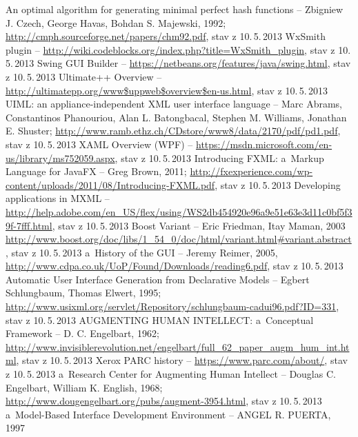 \documentclass[11pt,twoside,a4paper]{book}
\begin{document}

\begin{thebibliography}{99}
 An optimal algorithm for generating minimal perfect hash functions -- Zbigniew J. Czech, George Havas, Bohdan S. Majewski, 1992; \url{http://cmph.sourceforge.net/papers/chm92.pdf}, stav z 10.\,5.\,2013
 WxSmith plugin -- \url{http://wiki.codeblocks.org/index.php?title=WxSmith_plugin}, stav z 10.\,5.\,2013
 Swing GUI Builder -- \url{https://netbeans.org/features/java/swing.html}, stav z 10.\,5.\,2013
 Ultimate++ Overview -- \url{http://ultimatepp.org/www$uppweb$overview$en-us.html}, stav z 10.\,5.\,2013
 UIML: an appliance-independent XML user interface language -- Marc Abrams, Constantinos Phanouriou, Alan L. Batongbacal, Stephen M. Williams, Jonathan E. Shuster; \url{http://www.ramb.ethz.ch/CDstore/www8/data/2170/pdf/pd1.pdf}, stav z 10.\,5.\,2013
 XAML Overview (WPF) -- \url{https://msdn.microsoft.com/en-us/library/ms752059.aspx}, stav z 10.\,5.\,2013
 Introducing FXML: a~Markup Language for JavaFX -- Greg Brown, 2011; \url{http://fxexperience.com/wp-content/uploads/2011/08/Introducing-FXML.pdf}, stav z 10.\,5.\,2013
 Developing applications in MXML -- \url{http://help.adobe.com/en_US/flex/using/WS2db454920e96a9e51e63e3d11c0bf5f39f-7fff.html}, stav z 10.\,5.\,2013
 Boost Variant -- Eric Friedman, Itay Maman, 2003 \url{http://www.boost.org/doc/libs/1_54_0/doc/html/variant.html#variant.abstract}, stav z 10.\,5.\,2013
 a~History of the GUI -- Jeremy Reimer, 2005, \url{http://www.cdpa.co.uk/UoP/Found/Downloads/reading6.pdf}, stav z 10.\,5.\,2013
 Automatic User Interface Generation from Declarative Models -- Egbert Schlungbaum, Thomas Elwert, 1995; \url{http://www.usixml.org/servlet/Repository/schlungbaum-cadui96.pdf?ID=331}, stav z 10.\,5.\,2013
 AUGMENTING HUMAN INTELLECT: a~Conceptual Framework -- D. C. Engelbart, 1962; \url{http://www.invisiblerevolution.net/engelbart/full_62_paper_augm_hum_int.html}, stav z 10.\,5.\,2013
 Xerox PARC history -- \url{https://www.parc.com/about/}, stav z 10.\,5.\,2013
 a~Research Center for Augmenting Human Intellect -- Douglas C. Engelbart, William K. English, 1968; \url{http://www.dougengelbart.org/pubs/augment-3954.html}, stav z 10.\,5.\,2013
 a~Model-Based Interface Development Environment -- ANGEL R. PUERTA, 1997
\end{thebibliography}
\end{document}

